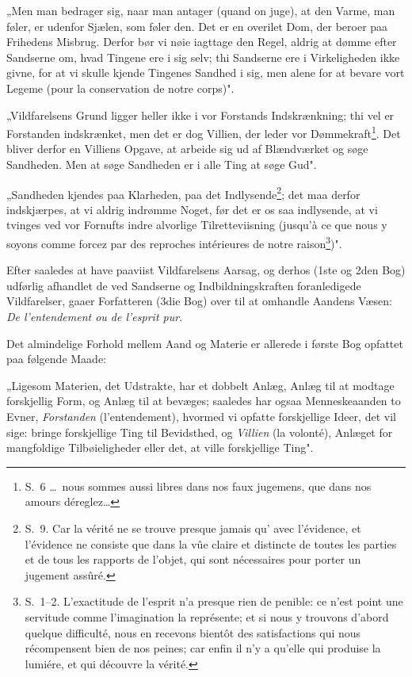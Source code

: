\documentclass[12pt,a4paper]{article}
\newcommand{\opage}[1]{\marginnote{\footnotesize\textit{[#1]}}}
\begin{document}
„Men man bedrager sig, naar man antager (quand on juge), at den
Varme, man føler, er udenfor Sjælen, som føler den. Det er en overilet
Dom, der beroer paa Frihedens Misbrug. Derfor bør vi nøie iagttage den
Regel, aldrig at dømme efter Sandserne om, hvad Tingene ere i sig selv;
thi Sandserne ere i Virkeligheden ikke givne, for at vi skulle kjende Tingenes
Sandhed i sig, men alene for at bevare vort Legeme (pour la conservation
de notre corps)".

„Vildfarelsens Grund ligger heller ikke i vor Forstands Indskrænkning;
thi vel er Forstanden indskrænket, men det er dog Villien, der leder vor
Dømmekraft\footnote{S.~6 \dots\ nous sommes aussi libres dans nos faux
jugemens, que dans nos amours déreglez\dots}. Det bliver derfor en Villiens
Opgave, at arbeide sig ud af Blændværket og søge Sandheden. Men at søge
Sandheden er i alle Ting at søge Gud".

„Sandheden kjendes paa Klarheden, paa det Indlysende\footnote{S.~9. Car
la vérité ne se trouve presque jamais qu' avec l'évidence, et l'évidence ne
consiste que dans la vûe claire et distincte de toutes les parties et de tous les
rapports de l'objet, qui sont nécessaires pour porter un jugement assûré.}; det
maa derfor indskjærpes, at vi aldrig indrømme Noget, før det er os saa
indlysende, at vi tvinges ved vor Fornufts indre alvorlige Tilretteviisning
(jusqu'à ce que nous y soyons comme forcez par des reproches intérieures de
notre raison\footnote{S.~1--2. L'exactitude de l'esprit n'a presque rien de
penible: ce n'est point une servitude comme l'imagination la représente; et si
nous y trouvons d'abord quelque difficulté, nous en recevons bientôt des
satisfactions qui nous récompensent bien de nos peines; car enfin il n'y a
qu'elle qui produise la lumiére, et qui découvre la vérité.})".

\opage{10} Efter saaledes at have paaviist Vildfarelsens Aarsag, og derhos (1ste
og 2den Bog) udførlig afhandlet de ved Sandserne og Indbildningskraften
foranledigede Vildfarelser, gaaer Forfatteren (3die Bog) over til at omhandle
Aandens Væsen: \emph{De l'entendement ou de l'esprit pur}.

Det almindelige Forhold mellem Aand og Materie er allerede i første
Bog opfattet paa følgende Maade:

„Ligesom Materien, det Udstrakte, har et dobbelt Anlæg, Anlæg til at
modtage forskjellig Form, og Anlæg til at bevæges; saaledes har ogsaa
Menneskeaanden to Evner, \emph{Forstanden} (l'entendement), hvormed vi
opfatte forskjellige Ideer, det vil sige: bringe forskjellige Ting til Bevidsthed,
og \emph{Villien} (la volonté), Anlæget for mangfoldige Tilbøieligheder eller
det, at ville forskjellige Ting".
\end{document}
